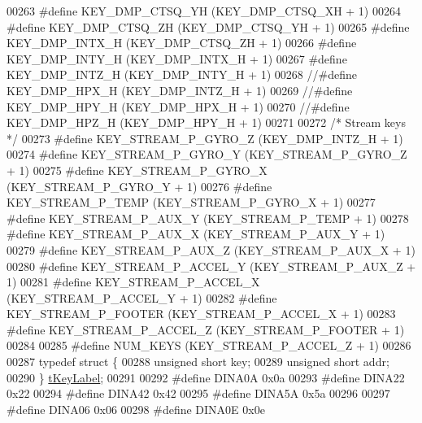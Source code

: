 \begin{DoxyCode}
00263 \textcolor{preprocessor}{#define KEY\_DMP\_CTSQ\_YH             (KEY\_DMP\_CTSQ\_XH + 1)}
00264 \textcolor{preprocessor}{#define KEY\_DMP\_CTSQ\_ZH             (KEY\_DMP\_CTSQ\_YH + 1)}
00265 \textcolor{preprocessor}{#define KEY\_DMP\_INTX\_H              (KEY\_DMP\_CTSQ\_ZH + 1)}
00266 \textcolor{preprocessor}{#define KEY\_DMP\_INTY\_H              (KEY\_DMP\_INTX\_H + 1)}
00267 \textcolor{preprocessor}{#define KEY\_DMP\_INTZ\_H              (KEY\_DMP\_INTY\_H + 1)}
00268 \textcolor{comment}{//#define KEY\_DMP\_HPX\_H               (KEY\_DMP\_INTZ\_H + 1)}
00269 \textcolor{comment}{//#define KEY\_DMP\_HPY\_H               (KEY\_DMP\_HPX\_H + 1)}
00270 \textcolor{comment}{//#define KEY\_DMP\_HPZ\_H               (KEY\_DMP\_HPY\_H + 1)}
00271 
00272 \textcolor{comment}{/* Stream keys */}
00273 \textcolor{preprocessor}{#define KEY\_STREAM\_P\_GYRO\_Z         (KEY\_DMP\_INTZ\_H + 1)}
00274 \textcolor{preprocessor}{#define KEY\_STREAM\_P\_GYRO\_Y         (KEY\_STREAM\_P\_GYRO\_Z + 1)}
00275 \textcolor{preprocessor}{#define KEY\_STREAM\_P\_GYRO\_X         (KEY\_STREAM\_P\_GYRO\_Y + 1)}
00276 \textcolor{preprocessor}{#define KEY\_STREAM\_P\_TEMP           (KEY\_STREAM\_P\_GYRO\_X + 1)}
00277 \textcolor{preprocessor}{#define KEY\_STREAM\_P\_AUX\_Y          (KEY\_STREAM\_P\_TEMP + 1)}
00278 \textcolor{preprocessor}{#define KEY\_STREAM\_P\_AUX\_X          (KEY\_STREAM\_P\_AUX\_Y + 1)}
00279 \textcolor{preprocessor}{#define KEY\_STREAM\_P\_AUX\_Z          (KEY\_STREAM\_P\_AUX\_X + 1)}
00280 \textcolor{preprocessor}{#define KEY\_STREAM\_P\_ACCEL\_Y        (KEY\_STREAM\_P\_AUX\_Z + 1)}
00281 \textcolor{preprocessor}{#define KEY\_STREAM\_P\_ACCEL\_X        (KEY\_STREAM\_P\_ACCEL\_Y + 1)}
00282 \textcolor{preprocessor}{#define KEY\_STREAM\_P\_FOOTER         (KEY\_STREAM\_P\_ACCEL\_X + 1)}
00283 \textcolor{preprocessor}{#define KEY\_STREAM\_P\_ACCEL\_Z        (KEY\_STREAM\_P\_FOOTER + 1)}
00284 
00285 \textcolor{preprocessor}{#define NUM\_KEYS                    (KEY\_STREAM\_P\_ACCEL\_Z + 1)}
00286 
00287 \textcolor{keyword}{typedef} \textcolor{keyword}{struct }\{
00288     \textcolor{keywordtype}{unsigned} \textcolor{keywordtype}{short} key;
00289     \textcolor{keywordtype}{unsigned} \textcolor{keywordtype}{short} addr;
00290 \} \hyperlink{structt_key_label}{tKeyLabel};
00291 
00292 \textcolor{preprocessor}{#define DINA0A 0x0a}
00293 \textcolor{preprocessor}{#define DINA22 0x22}
00294 \textcolor{preprocessor}{#define DINA42 0x42}
00295 \textcolor{preprocessor}{#define DINA5A 0x5a}
00296 
00297 \textcolor{preprocessor}{#define DINA06 0x06}
00298 \textcolor{preprocessor}{#define DINA0E 0x0e}

\end{DoxyCode}

